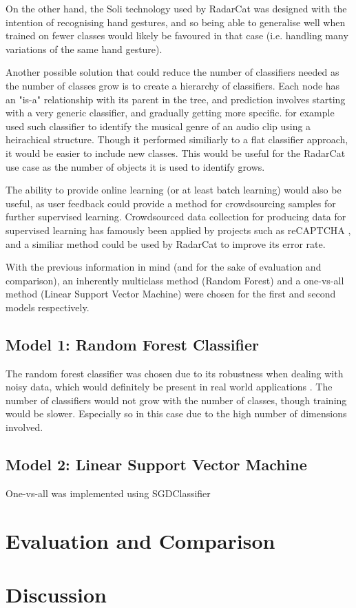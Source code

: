 \documentclass[12pt]{article}
\begin{document}
On the other hand, the Soli \cite{soli} technology used by RadarCat was designed with the intention of recognising hand gestures, and so being able to generalise well when trained on fewer classes would likely be favoured in that case (i.e. handling many variations of the same hand gesture).

Another possible solution that could reduce the number of classifiers needed as the number of classes grow is to create a hierarchy of classifiers. Each node has an "is-a" relationship with its parent in the tree, and prediction involves starting with a very generic classifier, and gradually getting more specific. \cite{heirarchy} for example used such classifier to identify the musical genre of an audio clip using a heirachical structure. Though it performed similiarly to a flat classifier approach, it would be easier to include new classes. This would be useful for the RadarCat use case as the number of objects it is used to identify grows.

The ability to provide online learning (or at least batch learning) would also be useful, as user feedback could provide a method for crowdsourcing samples for further supervised learning. Crowdsourced data collection for producing data for supervised learning has famously been applied by projects such as reCAPTCHA \cite{captcha}, and a similiar method could be used by RadarCat to improve its error rate.

With the previous information in mind (and for the sake of evaluation and comparison), an inherently multiclass method (Random Forest) and a one-vs-all method (Linear Support Vector Machine) were chosen for the first and second models respectively. 

\subsection{Model 1: Random Forest Classifier}

The random forest classifier was chosen due to its robustness when dealing with noisy data, which would definitely be present in real world applications \cite{rf}. The number of classifiers would not grow with the number of classes, though training would be slower. Especially so in this case due to the high number of dimensions involved.

\subsection{Model 2: Linear Support Vector Machine}

One-vs-all was implemented using SGDClassifier 

\section{Evaluation and Comparison}
\section{Discussion}



\end{document}
